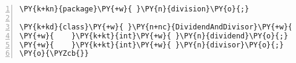 \begin{Verbatim}[commandchars=\\\{\},numbers=left,firstnumber=1,stepnumber=1,frame=single,fontsize=\small]
\PY{k+kn}{package}\PY{+w}{ }\PY{n}{division}\PY{o}{;}

\PY{k+kd}{class}\PY{+w}{ }\PY{n+nc}{DividendAndDivisor}\PY{+w}{ }\PY{k+kd}{implements}\PY{+w}{ }\PY{n}{Input}\PY{+w}{ }\PY{o}{\PYZob{}}
\PY{+w}{    }\PY{k+kt}{int}\PY{+w}{ }\PY{n}{dividend}\PY{o}{;}
\PY{+w}{    }\PY{k+kt}{int}\PY{+w}{ }\PY{n}{divisor}\PY{o}{;}
\PY{o}{\PYZcb{}}
\end{Verbatim}

